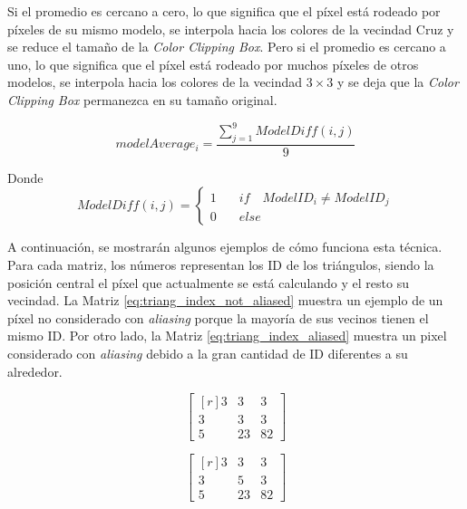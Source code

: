 \documentclass[pregrado]{tesis-usb} %
\begin{document}
Si el promedio es cercano a cero, lo que significa que el píxel está rodeado por píxeles de su mismo modelo, se interpola hacia los colores de la vecindad Cruz y se reduce el tamaño de la \textit{Color Clipping Box}. Pero si el promedio es cercano a uno, lo que significa que el píxel está rodeado por muchos píxeles de otros modelos, se interpola hacia los colores de la vecindad $3\times 3$ y se deja que la \textit{Color Clipping Box} permanezca en su tamaño original.

\begin{equation}\label{eq:model_index_acc}
modelAverage_i = \frac{\sum\limits_{j=1}^{9} ModelDiff(i,j)}{9} 
\end{equation}

Donde
\begin{equation*}
ModelDiff(i,j) = \left\lbrace \begin{split}1\quad & if\quad ModelID_i \neq ModelID_j \\ 0\quad & else\end{split} \right.
\end{equation*}

A continuación, se mostrarán algunos ejemplos de cómo funciona esta técnica. Para cada matriz, los números representan los ID de los triángulos, siendo la posición central el píxel que actualmente se está calculando y el resto su vecindad. La Matriz \ref{eq:triang_index_not_aliased} muestra un ejemplo de un píxel no considerado con \textit{aliasing} porque la mayoría de sus vecinos tienen el mismo ID. Por otro lado, la Matriz \ref{eq:triang_index_aliased} muestra un pixel considerado con \textit{aliasing} debido a la gran cantidad de ID diferentes a su alrededor.

\begin{equation}
\begin{bmatrix*}[r]\label{eq:triang_index_not_aliased}
3 &  3 & 3 \\
3 &  3 & 3 \\
5 &  23 & 82
\end{bmatrix*}
\end{equation}

\begin{equation}
\begin{bmatrix*}[r]\label{eq:triang_index_aliased}
3 &  3 & 3 \\
3 &  5 & 3 \\
5 &  23 & 82
\end{bmatrix*}
\end{equation}
\end{document}

